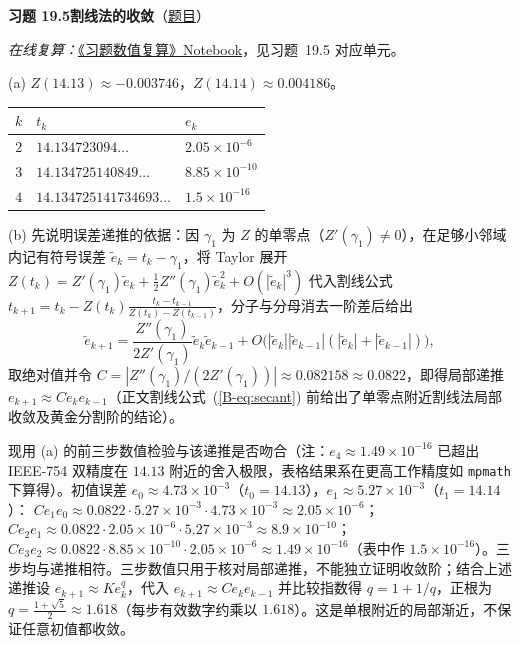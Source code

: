 \documentclass[11pt,a4paper]{article}
\newcommand{\bref}[1]{\ref*{B-#1}}
\newcommand{\Sol}[2]{%
  \par\addvspace{1.2em}\noindent
  \hypertarget{s:#1}{}\textbf{习题 #1\quad #2}\hfill{\small（\hyperlink{q:#1}{题目}）}\par
  \nopagebreak\smallskip}
\begin{document}
\Sol{19.5}{割线法的收敛}
\emph{在线复算：}\href{https://colab.research.google.com/github/lichengtong123/lichengtong-RH/blob/main/\%E4\%B9\%A0\%E9\%A2\%98\%E4\%B8\%8E\%E8\%A7\%A3\%E7\%AD\%94/\%E4\%B9\%A0\%E9\%A2\%98\%E6\%95\%B0\%E5\%80\%BC\%E5\%A4\%8D\%E7\%AE\%97.ipynb}{《习题数值复算》Notebook}，见习题~19.5 对应单元。

(a) $Z(14.13)\approx-0.003746$，$Z(14.14)\approx0.004186$。
\begin{center}
\small
\begin{tabular}{@{}cll@{}}
\toprule
$k$ & $t_k$ & $e_k$ \\
\midrule
$2$ & $14.134723094\ldots$ & $2.05\times10^{-6}$ \\
$3$ & $14.134725140849\ldots$ & $8.85\times10^{-10}$ \\
$4$ & $14.134725141734693\ldots$ & $1.5\times10^{-16}$ \\
\bottomrule
\end{tabular}
\end{center}

(b) 先说明误差递推的依据：因 $\gamma_1$ 为 $Z$ 的单零点（$Z'(\gamma_1)\ne0$），在足够小邻域内记有符号误差 $\tilde e_k=t_k-\gamma_1$，将 Taylor 展开 $Z(t_k)=Z'(\gamma_1)\tilde e_k+\frac12Z''(\gamma_1)\tilde e_k^2+O(|\tilde e_k|^3)$ 代入割线公式 $t_{k+1}=t_k-Z(t_k)\frac{t_k-t_{k-1}}{Z(t_k)-Z(t_{k-1})}$，分子与分母消去一阶差后给出
\[
  \tilde e_{k+1}=\frac{Z''(\gamma_1)}{2Z'(\gamma_1)}\tilde e_k\tilde e_{k-1}+O\bigl(|\tilde e_k||\tilde e_{k-1}|(|\tilde e_k|+|\tilde e_{k-1}|)\bigr),
\]
取绝对值并令 $C=|Z''(\gamma_1)/(2Z'(\gamma_1))|\approx0.082158\approx0.0822$，即得局部递推 $e_{k+1}\approx Ce_ke_{k-1}$（正文割线公式~(\bref{eq:secant}) 前给出了单零点附近割线法局部收敛及黄金分割阶的结论）。

现用 (a) 的前三步数值检验与该递推是否吻合（注：$e_4\approx1.49\times10^{-16}$ 已超出 IEEE-754 双精度在 $14.13$ 附近的舍入极限，表格结果系在更高工作精度如 \texttt{mpmath} 下算得）。初值误差 $e_0\approx4.73\times10^{-3}$（$t_0=14.13$），$e_1\approx5.27\times10^{-3}$（$t_1=14.14$）：
$Ce_1e_0\approx0.0822\cdot5.27\times10^{-3}\cdot4.73\times10^{-3}\approx2.05\times10^{-6}$；
$Ce_2e_1\approx0.0822\cdot2.05\times10^{-6}\cdot5.27\times10^{-3}\approx8.9\times10^{-10}$；
$Ce_3e_2\approx0.0822\cdot8.85\times10^{-10}\cdot2.05\times10^{-6}\approx1.49\times10^{-16}$（表中作 $1.5\times10^{-16}$）。三步均与递推相符。三步数值只用于核对局部递推，不能独立证明收敛阶；结合上述递推设 $e_{k+1}\approx Ke_k^q$，代入 $e_{k+1}\approx Ce_ke_{k-1}$ 并比较指数得 $q=1+1/q$，正根为 $q=\frac{1+\sqrt5}2\approx1.618$（每步有效数字约乘以 $1.618$）。这是单根附近的局部渐近，不保证任意初值都收敛。
\end{document}
